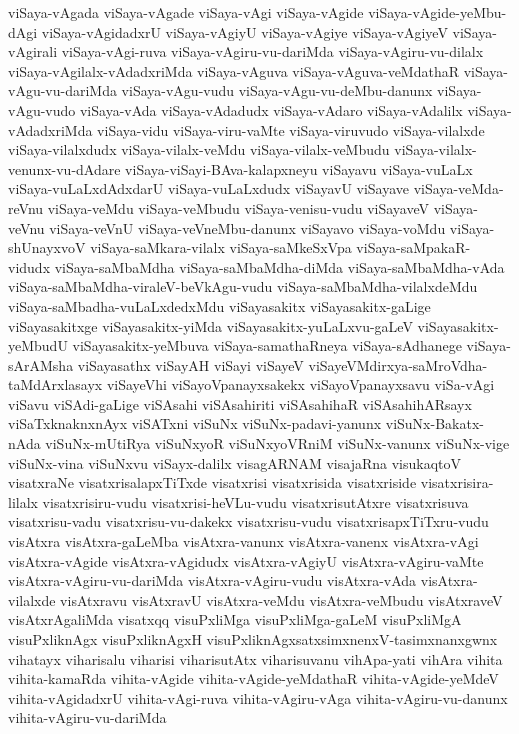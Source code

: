 {viSaya-vAgada
viSaya-vAgade
viSaya-vAgi
viSaya-vAgide
viSaya-vAgide-yeMbu-dAgi
viSaya-vAgidadxrU
viSaya-vAgiyU
viSaya-vAgiye
viSaya-vAgiyeV
viSaya-vAgirali
viSaya-vAgi-ruva
viSaya-vAgiru-vu-dariMda
viSaya-vAgiru-vu-dilalx
viSaya-vAgilalx-vAdadxriMda
viSaya-vAguva
viSaya-vAguva-veMdathaR
viSaya-vAgu-vu-dariMda
viSaya-vAgu-vudu
viSaya-vAgu-vu-deMbu-danunx
viSaya-vAgu-vudo
viSaya-vAda
viSaya-vAdadudx
viSaya-vAdaro
viSaya-vAdalilx
viSaya-vAdadxriMda
viSaya-vidu
viSaya-viru-vaMte
viSaya-viruvudo
viSaya-vilalxde
viSaya-vilalxdudx
viSaya-vilalx-veMdu
viSaya-vilalx-veMbudu
viSaya-vilalx-venunx-vu-dAdare
viSaya-viSayi-BAva-kalapxneyu
viSayavu
viSaya-vuLaLx
viSaya-vuLaLxdAdxdarU
viSaya-vuLaLxdudx
viSayavU
viSayave
viSaya-veMda-reVnu
viSaya-veMdu
viSaya-veMbudu
viSaya-venisu-vudu
viSayaveV
viSaya-veVnu
viSaya-veVnU
viSaya-veVneMbu-danunx
viSayavo
viSaya-voMdu
viSaya-shUnayxvoV
viSaya-saMkara-vilalx
viSaya-saMkeSxVpa
viSaya-saMpakaR-vidudx
viSaya-saMbaMdha
viSaya-saMbaMdha-diMda
viSaya-saMbaMdha-vAda
viSaya-saMbaMdha-viraleV-beVkAgu-vudu
viSaya-saMbaMdha-vilalxdeMdu
viSaya-saMbadha-vuLaLxdedxMdu
viSayasakitx
viSayasakitx-gaLige
viSayasakitxge
viSayasakitx-yiMda
viSayasakitx-yuLaLxvu-gaLeV
viSayasakitx-yeMbudU
viSayasakitx-yeMbuva
viSaya-samathaRneya
viSaya-sAdhanege
viSaya-sArAMsha
viSayasathx
viSayAH
viSayi
viSayeV
viSayeVMdirxya-saMroVdha-taMdArxlasayx
viSayeVhi
viSayoVpanayxsakekx
viSayoVpanayxsavu
viSa-vAgi
viSavu
viSAdi-gaLige
viSAsahi
viSAsahiriti
viSAsahihaR
viSAsahihARsayx
viSaTxknaknxnAyx
viSATxni
viSuNx
viSuNx-padavi-yanunx
viSuNx-Bakatx-nAda
viSuNx-mUtiRya
viSuNxyoR
viSuNxyoVRniM
viSuNx-vanunx
viSuNx-vige
viSuNx-vina
viSuNxvu
viSayx-dalilx
visagARNAM
visajaRna
visukaqtoV
visatxraNe
visatxrisalapxTiTxde
visatxrisi
visatxrisida
visatxriside
visatxrisira-lilalx
visatxrisiru-vudu
visatxrisi-heVLu-vudu
visatxrisutAtxre
visatxrisuva
visatxrisu-vadu
visatxrisu-vu-dakekx
visatxrisu-vudu
visatxrisapxTiTxru-vudu
visAtxra
visAtxra-gaLeMba
visAtxra-vanunx
visAtxra-vanenx
visAtxra-vAgi
visAtxra-vAgide
visAtxra-vAgidudx
visAtxra-vAgiyU
visAtxra-vAgiru-vaMte
visAtxra-vAgiru-vu-dariMda
visAtxra-vAgiru-vudu
visAtxra-vAda
visAtxra-vilalxde
visAtxravu
visAtxravU
visAtxra-veMdu
visAtxra-veMbudu
visAtxraveV
visAtxrAgaliMda
visatxqq
visuPxliMga
visuPxliMga-gaLeM
visuPxliMgA
visuPxliknAgx
visuPxliknAgxH
visuPxliknAgxsatxsimxnenxV-tasimxnanxgwnx
vihatayx
viharisalu
viharisi
viharisutAtx
viharisuvanu
vihApa-yati
vihAra
vihita
vihita-kamaRda
vihita-vAgide
vihita-vAgide-yeMdathaR
vihita-vAgide-yeMdeV
vihita-vAgidadxrU
vihita-vAgi-ruva
vihita-vAgiru-vAga
vihita-vAgiru-vu-danunx
vihita-vAgiru-vu-dariMda
}
